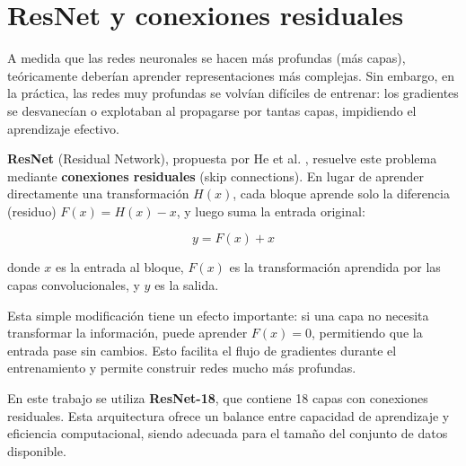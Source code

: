 \section{ResNet y conexiones residuales}
\label{sec:resnet}

A medida que las redes neuronales se hacen más profundas (más capas), teóricamente deberían aprender representaciones más complejas. Sin embargo, en la práctica, las redes muy profundas se volvían difíciles de entrenar: los gradientes se desvanecían o explotaban al propagarse por tantas capas, impidiendo el aprendizaje efectivo.

\textbf{ResNet} (Residual Network), propuesta por He et al. \cite{he2016deep}, resuelve este problema mediante \textbf{conexiones residuales} (skip connections). En lugar de aprender directamente una transformación $H(x)$, cada bloque aprende solo la diferencia (residuo) $F(x) = H(x) - x$, y luego suma la entrada original:

\begin{equation}
    y = F(x) + x
    \label{eq:residual}
\end{equation}

donde $x$ es la entrada al bloque, $F(x)$ es la transformación aprendida por las capas convolucionales, y $y$ es la salida.

Esta simple modificación tiene un efecto importante: si una capa no necesita transformar la información, puede aprender $F(x) = 0$, permitiendo que la entrada pase sin cambios. Esto facilita el flujo de gradientes durante el entrenamiento y permite construir redes mucho más profundas.

En este trabajo se utiliza \textbf{ResNet-18}, que contiene 18 capas con conexiones residuales. Esta arquitectura ofrece un balance entre capacidad de aprendizaje y eficiencia computacional, siendo adecuada para el tamaño del conjunto de datos disponible.

